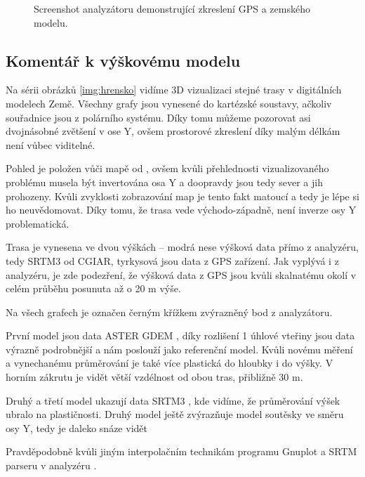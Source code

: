 \documentclass[thesis=B,czech]{FITthesis}[2012/06/26]
\begin{document}
\begin{figure}[htp]
\caption{Screenshot analyzátoru demonstrující zkreslení GPS a zemského modelu.}
\label{img:analyzatorScreen}
\end{figure}


\subsection{Komentář k výškovému modelu}

Na sérii obrázků \ref{img:hrensko} vidíme 3D vizualizaci stejné trasy v digitálních modelech Země. Všechny grafy jsou vynesené do kartézské soustavy, ačkoliv souřadnice jsou z polárního systému. Díky tomu můžeme pozorovat asi dvojnásobné zvětšení v ose Y, ovšem prostorové zkreslení díky malým délkám není vůbec viditelné. 

Pohled je položen vůči mapě od , ovšem kvůli přehlednosti vizualizovaného problému musela být invertována osa Y a doopravdy jsou tedy sever a jih prohozeny. Kvůli zvyklosti zobrazování map je tento fakt matoucí a tedy je lépe si ho neuvědomovat. Díky tomu, že trasa vede východo-západně, není inverze osy Y problematická.

Trasa je vynesena ve dvou výškách -- modrá nese výšková data přímo z analyzéru, tedy SRTM3 od CGIAR, tyrkysová jsou data z GPS zařízení. Jak vyplývá i z analyzéru, je zde podezření, že výšková data z GPS jsou kvůli skalnatému okolí v celém průběhu posunuta až o 20 m výše.

Na všech grafech je označen černým křížkem zvýrazněný bod z analyzátoru.

První model jsou data ASTER GDEM \cite{dem-aster}, díky rozlišení 1 úhlové vteřiny jsou data výrazně podrobnější a nám poslouží jako referenční model. Kvůli novému měření a vynechanému průměrování je také více plastická do hloubky i do výšky. V horním zákrutu je vidět větší vzdélnost od obou tras, přibližně 30 m.


Druhý a třetí model ukazují data SRTM3 \cite{dem-srtm}, kde vidíme, že průměrování výšek ubralo na plastičnosti. Druhý model ještě zvýrazňuje model soutěsky ve směru osy Y, tedy je daleko snáze vidět 


Pravděpodobně kvůli jiným interpolačním technikám programu Gnuplot a SRTM parseru v analyzéru \cite{osola}.
\end{document}
